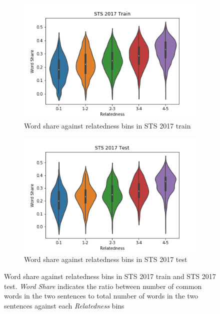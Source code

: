 \begin{enumerate}
\begin{figure}
	\captionsetup[subfigure]{justification=centering}
	\centering
	\begin{subfigure}[b]{.5\textwidth}
		\centering
		\includegraphics[width=\textwidth]{figures/semantic_textual_similarity/introduction/sts_2017_train_word_share.png}
		\caption{Word share against relatedness bins in STS 2017 train}
		\label{fig:sts_train_word_share}
	\end{subfigure}%
	\begin{subfigure}[b]{.5\textwidth}
		\centering
		\includegraphics[width=\textwidth]{figures/semantic_textual_similarity/introduction/sts_2017_test_word_share.png}
		\caption{Word share against relatedness bins in STS 2017 test}
		\label{fig:sts_test_word_share}
	\end{subfigure}
	\caption[Word share against relatedness bins in STS 2017 train and STS 2017 test.]{Word share against relatedness bins in STS 2017 train and STS 2017 test. \textit{Word Share} indicates the ratio between number of common words in the two sentences to total number of words in the two sentences against each \textit{Relatedness} bins}
	\label{fig:sts_word_share}
\end{figure}



\end{enumerate}
